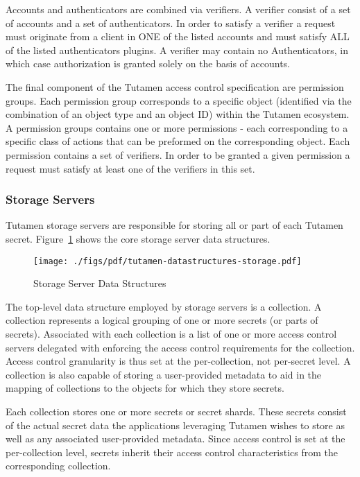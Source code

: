 Accounts and authenticators are combined via verifiers. A verifier
consist of a set of accounts and a set of authenticators. In order to
satisfy a verifier a request must originate from a client in ONE of
the listed accounts and must satisfy ALL of the listed authenticators
plugins. A verifier may contain no Authenticators, in which case
authorization is granted solely on the basis of accounts.

The final component of the Tutamen access control specification are
permission groups. Each permission group corresponds to a specific
object (identified via the combination of an object type and an object
ID) within the Tutamen ecosystem. A permission groups contains one or
more permissions - each corresponding to a specific class of actions
that can be preformed on the corresponding object. Each permission
contains a set of verifiers. In order to be granted a given permission
a request must satisfy at least one of the verifiers in this set.

\subsubsection{Storage Servers}
\label{sec:tutamen:arch:ss}

Tutamen storage servers are responsible for storing all or part of
each Tutamen secret. Figure~\ref{fig:tutamen:storagestructs} shows the
core storage server data structures.

\begin{figure}[th]
  \centering
  \texttt{[image: ./figs/pdf/tutamen-datastructures-storage.pdf]}
  \caption{Storage Server Data Structures}
  \label{fig:tutamen:storagestructs}
\end{figure}

The top-level data structure employed by storage servers is a
collection. A collection represents a logical grouping of one or more
secrets (or parts of secrets). Associated with each collection is a
list of one or more access control servers delegated with enforcing
the access control requirements for the collection. Access control
granularity is thus set at the per-collection, not per-secret level. A
collection is also capable of storing a user-provided metadata to aid
in the mapping of collections to the objects for which they store
secrets.

Each collection stores one or more secrets or secret shards. These
secrets consist of the actual secret data the applications leveraging
Tutamen wishes to store as well as any associated user-provided
metadata. Since access control is set at the per-collection level,
secrets inherit their access control characteristics from the
corresponding collection.

